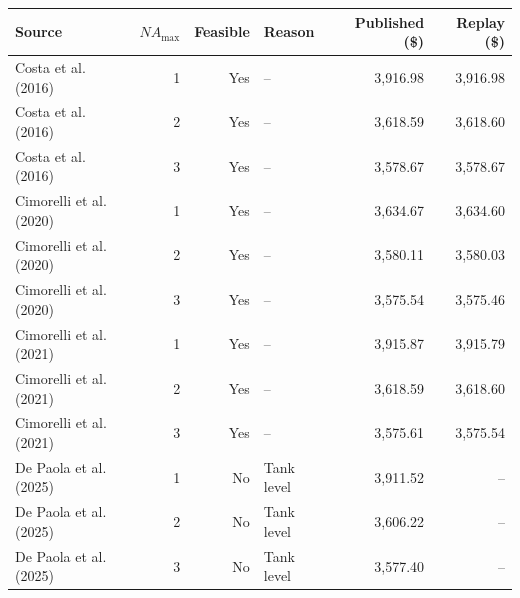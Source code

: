 \begin{tabular}{@{}lrrlrr@{}}
  \hline
  Source & $NA_{\max}$ & Feasible & Reason & Published (\$) & Replay (\$) \\
  \hline
  Costa et al. (2016) & 1 & Yes & -- & 3{,}916.98 & 3{,}916.98 \\
  Costa et al. (2016) & 2 & Yes & -- & 3{,}618.59 & 3{,}618.60 \\
  Costa et al. (2016) & 3 & Yes & -- & 3{,}578.67 & 3{,}578.67 \\
  Cimorelli et al. (2020) & 1 & Yes & -- & 3{,}634.67 & 3{,}634.60 \\
  Cimorelli et al. (2020) & 2 & Yes & -- & 3{,}580.11 & 3{,}580.03 \\
  Cimorelli et al. (2020) & 3 & Yes & -- & 3{,}575.54 & 3{,}575.46 \\
  Cimorelli et al. (2021) & 1 & Yes & -- & 3{,}915.87 & 3{,}915.79 \\
  Cimorelli et al. (2021) & 2 & Yes & -- & 3{,}618.59 & 3{,}618.60 \\
  Cimorelli et al. (2021) & 3 & Yes & -- & 3{,}575.61 & 3{,}575.54 \\
  De Paola et al. (2025) & 1 & No & Tank level & 3{,}911.52 & -- \\
  De Paola et al. (2025) & 2 & No & Tank level & 3{,}606.22 & -- \\
  De Paola et al. (2025) & 3 & No & Tank level & 3{,}577.40 & -- \\
  \hline
\end{tabular}
